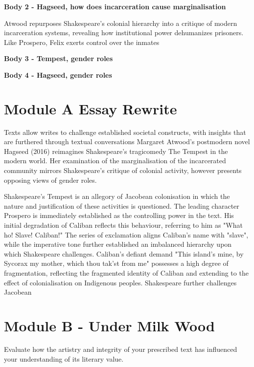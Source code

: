 	\textbf{Body 2 - Hagseed, how does incarceration cause marginalisation}

	Atwood repurposes Shakespeare’s colonial hierarchy into a critique of modern incarceration systems, revealing how institutional power dehumanizes prisoners. Like Prospero, Felix exerts control over the inmates 

	\textbf{Body 3 - Tempest, gender roles}
	
	\textbf{Body 4 - Hagseed, gender roles}



\section{Module A Essay Rewrite}
	
	Texts allow writes to challenge established societal constructs, with insights that are furthered through textual conversations Margaret Atwood's postmodern novel Hagseed (2016) reimagines Shakespeare's tragicomedy The Tempest in the modern world. Her examination of the marginalisation of the incarcerated community mirrors Shakespeare's critique of colonial activity, however presents opposing views of gender roles.

	Shakespeare's Tempest is an allegory of Jacobean colonisation in which the nature and justification of these activities is questioned. The leading character Prospero is immediately established as the controlling power in the text. His initial degradation of Caliban reflects this behaviour, referring to him as "What ho! Slave! Caliban!" The series of exclamation aligns Caliban's name with "slave", while the imperative tone further established an imbalanced hierarchy upon which Shakespeare challenges. Caliban's defiant demand "This island's mine, by Sycorax my mother, which thou tak'st from me" possesses a high degree of fragmentation, reflecting the fragmented identity of Caliban and extending to the effect of colonialisation on Indigenous peoples. Shakespeare further challenges Jacobean

\newpage

\section{Module B - Under Milk Wood}

	\begin{center}
		\large
		Evaluate how the artistry and integrity of your prescribed text has influenced your understanding of its literary value.
	\end{center}

